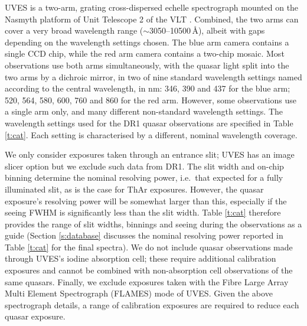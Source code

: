 \documentclass[fleqn,usenatbib,usedcolumn]{mnras}
\newcommand{\Sref}[1]{Section \ref{#1}}
\newcommand{\Tref}[1]{Table \ref{#1}}
\begin{document}
UVES is a two-arm, grating cross-dispersed echelle spectrograph mounted on the Nasmyth platform of Unit Telescope 2 of the VLT \citep{Dekker:2000:534}. Combined, the two arms can cover a very broad wavelength range ($\sim$3050--10500\,\AA), albeit with gaps depending on the wavelength settings chosen. The blue arm camera contains a single CCD chip, while the red arm camera contains a two-chip mosaic. Most observations use both arms simultaneously, with the quasar light split into the two arms by a dichroic mirror, in two of nine standard wavelength settings named according to the central wavelength, in nm: 346, 390 and 437 for the blue arm; 520, 564, 580, 600, 760 and 860 for the red arm. However, some observations use a single arm only, and many different non-standard wavelength settings. The wavelength settings used for the DR1 quasar observations are specified in \Tref{t:cat}. Each setting is characterised by a different, nominal wavelength coverage.

We only consider exposures taken through an entrance slit; UVES has an image slicer option but we exclude such data from DR1. The slit width and on-chip binning determine the nominal resolving power, i.e.\ that expected for a fully illuminated slit, as is the case for ThAr exposures. However, the quasar exposure's resolving power will be somewhat larger than this, especially if the seeing FWHM is significantly less than the slit width. \Tref{t:cat} therefore provides the range of slit widths, binnings and seeing during the observations as a guide (\Sref{s:database} discusses the nominal resolving power reported in \Tref{t:cat} for the final spectra). We do not include quasar observations made through UVES's iodine absorption cell; these require additional calibration exposures and cannot be combined with non-absorption cell observations of the same quasars. Finally, we exclude exposures taken with the Fibre Large Array Multi Element Spectrograph (FLAMES) mode of UVES. Given the above spectrograph details, a range of calibration exposures are required to reduce each quasar exposure.
\end{document}
